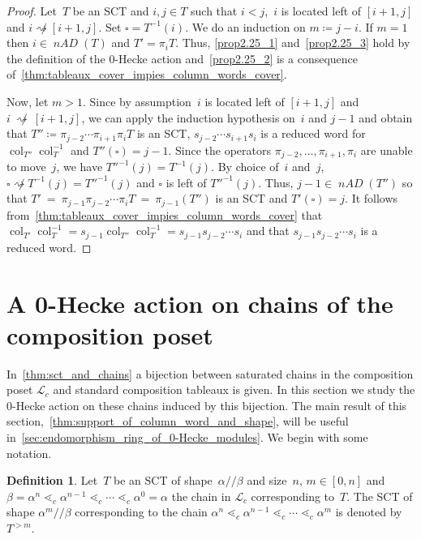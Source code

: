 \documentclass[10pt]{amsart}
\theoremstyle{plain}
\theoremstyle{plain}
\theoremstyle{plain}
\theoremstyle{plain}
\theoremstyle{plain}
\theoremstyle{definition}
\newtheorem{defi}[defi]{Definition}
\theoremstyle{definition}
\newcommand{\mc}[1]{\mathcal{#1} }
\newcommand{\nAD}{\operatorname{\mathit{nAD}}}
\newcommand{\fs}{s}
\newcommand{\col}{\operatorname{col}}
\newcommand{\skc}{/ \! \! / }
\newcommand{\ab}{{\alpha / \! \! / \beta}}
\newcommand{\natt}{\not \rightsquigarrow}
\newcommand{\cell}{\square}
\begin{document}
\begin{proof}
	Let~$T$ be an SCT and $i,j\in T$ such that $i<j$,~$i$ is located left of $[i+1,j]$
	and $i \natt[i+1,j]$. Set $\cell = T^{-1}(i)$.
	We do an induction on $m\coloneqq j-i$. If $m=1$ then $i\in \nAD(T)$ and $T' = \pi_i T$. Thus, 	\eqref{prop2.25_1} and~\eqref{prop2.25_3} hold by the definition of the 0-Hecke action and~\eqref{prop2.25_2} is a consequence of~\cref{thm:tableaux_cover_impies_column_words_cover}.
	
	Now, let $m>1$. Since by assumption~$i$ is located left of $[i+1,j]$
	and $i~\natt~[i+1,j]$, we can apply the induction hypothesis on~$i$ and $j-1$ and obtain that $T''\coloneqq \pi_{j-2} \cdots \pi_{i+1}\pi_i T$ is an SCT, $\fs_{j-2} \cdots \fs_{i+1}\fs_i$ is a reduced word for $\col_{T''}\col_T^{-1}$ and $T''(\cell) = j-1$.
	Since the operators $\pi_{j-2}, \ldots, \pi_{i+1}, \pi_{i}$ are unable to move~$j$, we have $T''^{-1}(j) = T^{-1}(j).$
	By choice of~$i$ and~$j$, $\cell \natt T^{-1}(j) = T''^{-1}(j)$ and $\cell$ is left of $T''^{-1}(j)$.
	Thus, $j-1\in \nAD(T'')$ so that $T'~=~\pi_{j-1} \pi_{j-2}\cdots \pi_i T~=~\pi_{j-1}(T'')$ is an SCT and $T'(\cell) = j$.
	It follows from~\cref{thm:tableaux_cover_impies_column_words_cover} that $\col_{T'}\col_T^{-1}=s_{j-1}\col_{T''}\col^{-1}_{T}= \fs_{j-1}\fs_{j-2} \cdots \fs_i$ and that $\fs_{j-1}\fs_{j-2} \cdots \fs_i$ is a reduced word.
\end{proof}


\section{A 0-Hecke action on chains of the composition poset}

\label{sec:0-hecke_operation_and_chains}

In~\cref{thm:sct_and_chains} a bijection between saturated chains in the composition poset $\mc L_c$ and standard composition tableaux is given. 
In this section we study the 0-Hecke action on these chains induced by this bijection. The main result of this section,~\cref{thm:support_of_column_word_and_shape}, will be useful in~\cref{sec:endomorphism_ring_of_0-Hecke_modules}. We begin with some notation.

\begin{defi}
	\label{thm:parts_of_chains_in_L_c}
	Let~$T$ be an SCT of shape~$\ab$ and size~$n$, $m\in [0,n]$ and ${\beta = \alpha^n \lessdot_c \alpha^{n-1} \lessdot_c \cdots \lessdot_c \alpha^0 =\alpha}$ the chain in $\mathcal L_c$ corresponding to~$T$. 
	 The SCT of shape $\alpha^m \skc \beta$ corresponding to the chain $\alpha^n \lessdot_c \alpha^{n-1}\lessdot_c \cdots \lessdot_c \alpha^m$ is denoted by $T^{>m}$.
\end{defi}
\end{document}
